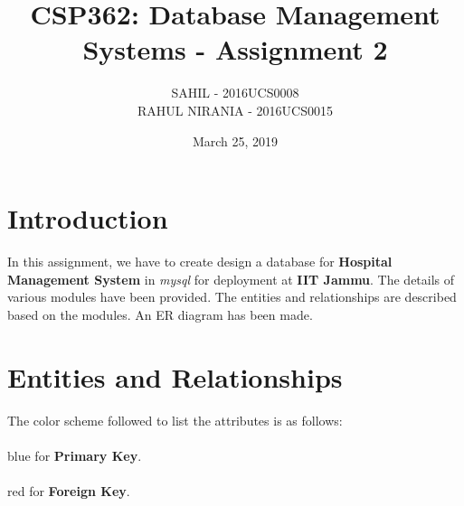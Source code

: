 \documentclass{article}
\title{CSP362: Database Management Systems - Assignment 2}
\author{SAHIL - 2016UCS0008 \\ RAHUL NIRANIA - 2016UCS0015}
\date{March 25, 2019}
\begin{document}
\maketitle

\tableofcontents

\section{Introduction}
\large
In this assignment, we have to create design a database for \textbf{Hospital Management System} in \textit{mysql} for deployment at \textbf{IIT Jammu}. The details of various modules have been provided. The entities and relationships are described based on the modules. An ER diagram has been made.

\section{Entities and Relationships}
The color scheme followed to list the attributes is as follows: \\ \\
{\color{blue}blue} for \textbf{Primary Key}. \\ \\
{\color{red}red} for \textbf{Foreign Key}. \\ \\
\end{document}
